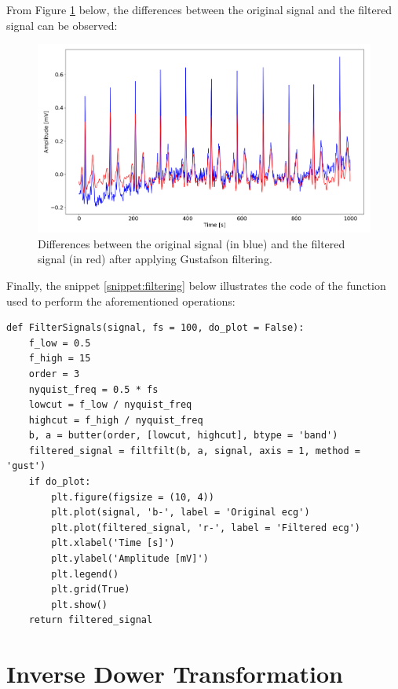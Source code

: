 \documentclass[12pt,italian]{report}
\begin{document}
From Figure \ref{fig:filtering} below, the differences between the original signal and the filtered signal can be observed:

\begin{figure}[H]
    \centering
    \includegraphics[width=1\textwidth]{images/filtering.png}
    \captionsetup{justification=centering}
    \caption{Differences between the original signal (in blue) and the filtered signal (in red) after applying Gustafson filtering.}
    \label{fig:filtering}
\end{figure}

Finally, the snippet \ref{snippet:filtering} below illustrates the code of the function used to perform the aforementioned operations:

\lstset{language=Python}
\begin{lstlisting}[aboveskip=15pt, belowskip=15pt, basicstyle=\fontsize{8}{10}\selectfont, keywordstyle=\color{blue}, breaklines=true, label=snippet:filtering]
def FilterSignals(signal, fs = 100, do_plot = False):
    f_low = 0.5
    f_high = 15
    order = 3
    nyquist_freq = 0.5 * fs
    lowcut = f_low / nyquist_freq
    highcut = f_high / nyquist_freq
    b, a = butter(order, [lowcut, highcut], btype = 'band')
    filtered_signal = filtfilt(b, a, signal, axis = 1, method = 'gust')
    if do_plot:
        plt.figure(figsize = (10, 4))
        plt.plot(signal, 'b-', label = 'Original ecg')
        plt.plot(filtered_signal, 'r-', label = 'Filtered ecg')
        plt.xlabel('Time [s]')
        plt.ylabel('Amplitude [mV]')
        plt.legend()
        plt.grid(True)
        plt.show()
    return filtered_signal
\end{lstlisting}

\section{Inverse Dower Transformation}
\label{sec:matrice}
\end{document}
